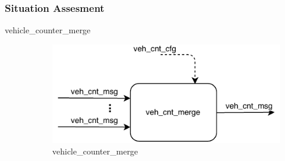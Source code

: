 \subsubsection{Situation Assesment}
\begin{description}

\item[vehicle\_counter\_merge] \hfill
\begin{figure}[ht!]
\centering
\includegraphics[scale=1]{fig/3/veh_cnt_merge.pdf}
\caption{vehicle\_counter\_merge}
\label{vehicle_counter_merge}
\end{figure}
%

\end{description}

